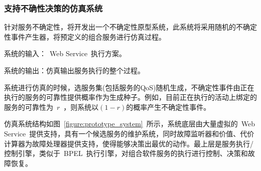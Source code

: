 %
%
%
%
%
%
%
%
%
%
%
%
%

\subsubsection{支持不确性决策的仿真系统}

针对服务不确定性，将开发出一个不确定性原型系统，此系统将采用随机的不确定性事件产生器，将预定义的组合服务进行仿真过程。

系统的输入：~Web Service~执行方案。

系统的输出：仿真输出服务执行的整个过程。

系统进行仿真的时候，选服务集(包括服务的QoS)随机生成，不确定性事件由正在执行的服务的可靠性提供概率作为生成种子。例如，目前正在执行的活动上绑定的服务的可靠性为~$r$~，则系统以$(1-r)$的概率产生不确定性事件。

仿真系统结构如图~\ref{figure:prototype_system}~所示，系统底层由大量虚拟的~Web Service~提供支持，具有一个候选服务的维护系统，同时故障监听器和价值、代价计算器为故障处理器提供支持，使得能够决策出最优的动作。最上层是服务执行/控制引擎，类似于~BPEL~执行引擎，对组合软件服务的执行进行控制、决策和故障恢复。

